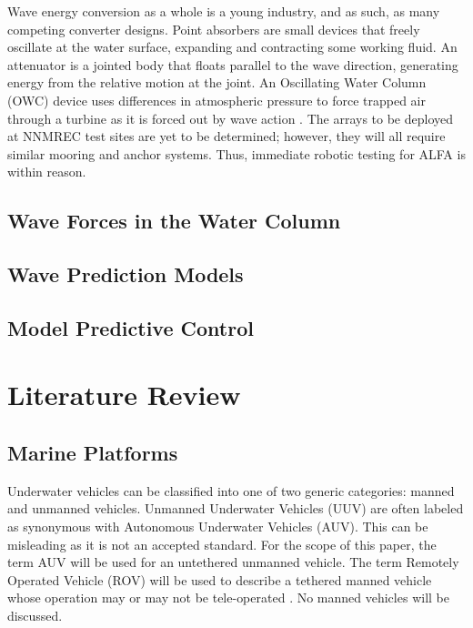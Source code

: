\documentclass[double,12pt]{beavtex}
\begin{document}
Wave energy conversion as a whole is a young industry, and as such, as many competing converter designs. Point absorbers are small devices that freely oscillate at the water surface, expanding and contracting some working fluid. An attenuator is a jointed body that floats parallel to the wave direction, generating energy from the relative motion at the joint. An Oscillating Water Column (OWC) device uses differences in atmospheric pressure to force trapped air through a turbine as it is forced out by wave action \cite{falnes}. The arrays to be deployed at NNMREC test sites are yet to be determined; however, they will all require similar mooring and anchor systems. Thus, immediate robotic testing for ALFA is within reason.

\section{Wave Forces in the Water Column}

\section{Wave Prediction Models}

\section{Model Predictive Control} 



\chapter{Literature Review}

\section{Marine Platforms}

Underwater vehicles can be classified into one of two generic categories: manned and unmanned vehicles. Unmanned Underwater Vehicles (UUV) are often labeled as synonymous with Autonomous Underwater Vehicles (AUV). This can be misleading as it is not an accepted standard. For the scope of this paper, the term AUV will be used for an untethered unmanned vehicle. The term Remotely Operated Vehicle (ROV) will be used to describe a tethered manned vehicle whose operation may or may not be tele-operated \cite{ROV}. No manned vehicles will be discussed.
\end{document}
